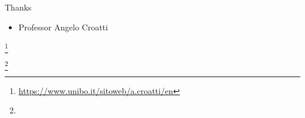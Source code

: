 \newcommand\blfootnote[1]{%
  \begingroup
  \renewcommand\thefootnote{}\footnote{#1}%
  \addtocounter{footnote}{-1}%
  \endgroup
}

\begin{frame}{Thanks}
    \centering
    \begin{itemize}
      \item \large{Professor Angelo Croatti}
    \end{itemize}

    \blfootnote{\url{https://www.unibo.it/sitoweb/a.croatti/en}}
    \blfootnote{}
\end{frame}
